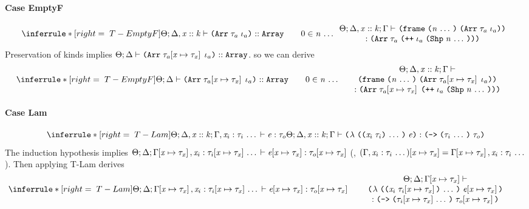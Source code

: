\begin{sproof}
  \paragraph{Case {\sc EmptyF}}
  \[{\infr[T-EmptyF]
    {\kindof{\sEnv}{\kEnv, \haskind{\var}{\kind}}
      {\typearray{\type_a}{\idx_a}}
      {\kindarray}
      \qquad 0 \in \sequence{\nat}}
    {\parbox{0.6\textwidth}
      {\centering
        \({\sEnv};{\kEnv, \haskind{\var}{\kind}};{\tEnv}\vdash\)
        \({\emptyfrm{\typearray{\type_a}{\idx_a}}{\sequence{\nat}}}\)
        \(:{\typearray{\type_a}{\idxappend{\idx_a \; \idxshape{\sequence{\nat}}}}}\)}}}\]
  Preservation of kinds implies
  $\kindof{\sEnv}{\kEnv}{\typearray{\typesubst{\type_a}}{\idx_a}}{\kindarray}$.
  so we can derive
  \[{\infr[T-EmptyF]
    {\kindof{\sEnv}{\kEnv}
      {\typearray{\typesubst{\type_a}}{\idx_a}}
      {\kindarray}
      \qquad 0 \in \sequence{\nat}}
    {\parbox{0.6\textwidth}
      {\centering
        \({\sEnv};{\kEnv, \haskind{\var}{\kind}};{\tEnv}\vdash\)
        \({\emptyfrm{\typearray{\typesubst{\type_a}}{\idx_a}}{\sequence{\nat}}}\)
        \(:{\typearray{\typesubst{\type_a}}{\idxappend{\idx_a \; \idxshape{\sequence{\nat}}}}}\)}}}\]
  \paragraph{Case {\sc Lam}}
  \[{\infr[T-Lam]
    {\typeof{\sEnv}{\kEnv, \haskind{\var}{\kind}}
      {\tEnv, \sequence{\hastype{\var_i}{\type_i}}}
      {\expr}{\type_o}}
    {\typeof{\sEnv}{\kEnv, \haskind{\var}{\kind}}{\tEnv}
      {\lam{\sequence{\notevar{\var_i}{\type_i}}}{\expr}}
      {\typefun{\sequence{\type_i}}{\type_o}}}}\]
  The induction hypothesis implies
  $\Theta;\Delta;\Gamma\hspace{-2pt}\left[ \mathit{x} \mapsto \mathit{\tau}_{\mathit{x}} \right], \mathit{x}_i : \mathit{\tau}_i\hspace{-2pt}\left[ \mathit{x} \mapsto \mathit{\tau}_{\mathit{x}} \right] \, \ldots \, \vdash \mathit{e}\hspace{-2pt}\left[ \mathit{x} \mapsto \mathit{\tau}_{\mathit{x}} \right] : \mathit{\tau}_o\hspace{-2pt}\left[ \mathit{x} \mapsto \mathit{\tau}_{\mathit{x}} \right]$
  (\nb,
  $\left( \Gamma, \mathit{x}_i : \mathit{\tau}_i \, \ldots \, \right)\hspace{-2pt}\left[ \mathit{x} \mapsto \mathit{\tau}_{\mathit{x}} \right]
  = \Gamma\hspace{-2pt}\left[ \mathit{x} \mapsto \mathit{\tau}_{\mathit{x}} \right], \mathit{x}_i : \mathit{\tau}_i \, \ldots \,$).
  Then applying {\sc T-Lam} derives
  \[{\infr[T-Lam]
    {\typeof{\sEnv}{\kEnv}
      {\typesubst{\tEnv}, \sequence{\hastype{\var_i}{\typesubst{\type_i}}}}
      {\typesubst{\expr}}{\typesubst{\type_o}}}
    {\parbox{0.6\textwidth}
      {\centering
        \({\sEnv};{\kEnv};{\typesubst{\tEnv}}\vdash\)
        \({\lam{\sequence{\notevar{\var_i}{\typesubst{\type_i}}}}{\typesubst{\expr}}}\)
        \(:{\typefun{\sequence{\typesubst{\type_i}}}{\typesubst{\type_o}}}\)}}}\]

\end{sproof}
